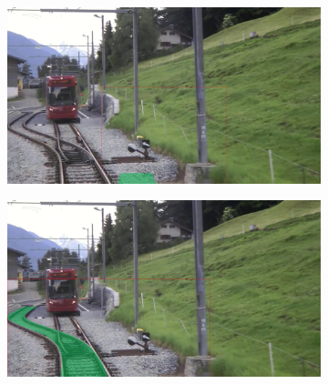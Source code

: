 \begin{figure}[H]
\begin{minipage}{0.6\textwidth}
        \vspace{0.5cm} %
        
        \begin{subfigure}[b]{0.48\textwidth}
            \centering
            \includegraphics[width=\textwidth]{PICs/experiments/ComparisonBaselineToImproved/original1.jpg}
        \end{subfigure}
        \begin{subfigure}[b]{0.48\textwidth}
            \centering
            \includegraphics[width=\textwidth]{PICs/experiments/ComparisonBaselineToImproved/adapted1.jpg}
        \end{subfigure}
        
        \vspace{0.5cm} %
        

\end{minipage}
\end{figure}
